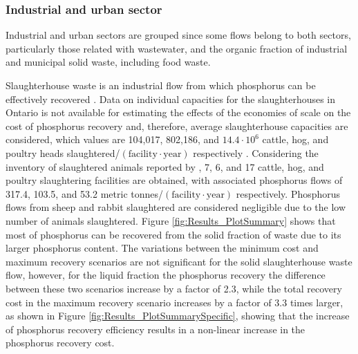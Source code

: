 \documentclass[authoryear]{elsarticle}
\begin{document}
\subsubsection{Industrial and urban sector}
Industrial and urban sectors are grouped since some flows belong to both sectors, particularly those related with wastewater, and the organic fraction of industrial and municipal solid waste, including food waste.

Slaughterhouse waste is an industrial flow from which phosphorus can be effectively recovered \citep{Pearl2Kcost2}. Data on individual capacities for the slaughterhouses in Ontario is not available for estimating the effects of the economies of scale on the cost of phosphorus recovery  and, therefore, average slaughterhouse capacities are considered, which values are 104,017, 802,186, and $14.4 \cdot 10^6$ cattle, hog, and poultry heads slaughtered/$\left(\text{facility} \cdot \text{year}\right) $ respectively \citep{SlaughterhouseDistribution, SlaughterhousePoultryAverageSize}. Considering the inventory of slaughtered animals reported by \citet{SlaughterFederalRedMeat, SlaughterFederalPoultry}, 7, 6, and 17 cattle, hog, and poultry slaughtering facilities are obtained, with associated phosphorus flows of 317.4, 103.5, and 53.2 metric tonnes/$\left(\text{facility} \cdot \text{year}\right) $ respectively. Phosphorus flows from sheep and rabbit slaughtered are considered negligible due to the low number of animals slaughtered. Figure \ref{fig:Results_PlotSummary} shows that most of phosphorus can be recovered from the solid fraction of waste due to its larger phosphorus content. The variations between the minimum cost and maximum recovery scenarios are not significant for the solid slaughterhouse waste flow, however, for the liquid fraction the phosphorus recovery the difference between these two scenarios increase by a factor of 2.3, while the total recovery cost in the maximum recovery scenario increases by a factor of 3.3 times larger, as shown in Figure \ref{fig:Results_PlotSummarySpecific}, showing that the increase of phosphorus recovery efficiency results in a non-linear increase in the phosphorus recovery cost. {\color{red}{The numerical results are collected in the Supplementary Material}}
\end{document}
